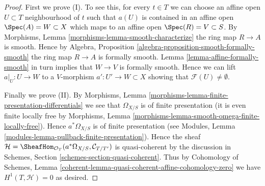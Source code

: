 \begin{proof}
\medskip\noindent
First we prove (I). To see this, for every $t \in T$ we can
choose an affine open $U \subset T$ neighbourhood of $t$
such that $a(U)$ is contained
in an affine open $\Spec(A) = W \subset X$
which maps to an affine open $\Spec(R) = V \subset S$.
By Morphisms, Lemma \ref{morphisms-lemma-smooth-characterize}
the ring map $R \to A$ is smooth.
Hence by Algebra, Proposition \ref{algebra-proposition-smooth-formally-smooth}
the ring map $R \to A$ is formally smooth.
Lemma \ref{lemma-affine-formally-smooth}
in turn implies that $W \to V$ is formally smooth.
Hence we can lift $a|_U : U \to W$ to a $V$-morphism
$a' : U' \to W \subset X$ showing that $\mathcal{F}(U) \not = \emptyset$.

\medskip\noindent
Finally we prove (II).
By Morphisms, Lemma \ref{morphisms-lemma-finite-presentation-differentials}
we see that $\Omega_{X/S}$ is of finite presentation
(it is even finite locally free by
Morphisms, Lemma \ref{morphisms-lemma-smooth-omega-finite-locally-free}).
Hence $a^*\Omega_{X/S}$ is of finite presentation (see
Modules, Lemma \ref{modules-lemma-pullback-finite-presentation}).
Hence the sheaf
$\mathcal{H} =
\SheafHom_{\mathcal{O}_T}(a^*\Omega_{X/S}, \mathcal{C}_{T/T'})$
is quasi-coherent by the discussion in
Schemes, Section \ref{schemes-section-quasi-coherent}.
Thus by Cohomology of Schemes, Lemma
\ref{coherent-lemma-quasi-coherent-affine-cohomology-zero}
we have $H^1(T, \mathcal{H}) = 0$ as desired.
\end{proof}